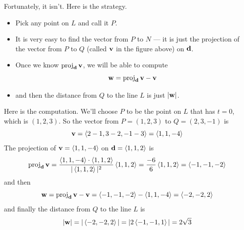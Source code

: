 \begin{eg}
Fortunately, it isn't. Here is the strategy.
\begin{itemize}\itemsep1pt \parskip0pt 
\item 
Pick any point on $L$ and call it $P$.
\item
It is very easy to find the vector from $P$ to $N$ --- it is just the projection of the vector from $P$ to $Q$ (called $\mathbf{v}$ in the figure above)
on $\mathbf{d}$.
\item
Once we know ${\rm proj}_{\mathbf{d}}\,\mathbf{v}$, we will be able to compute
\begin{equation*}
\mathbf{w} = {\rm proj}_{\mathbf{d}}\,\mathbf{v} -\mathbf{v}
\end{equation*}
\item
and then the distance from $Q$ to the line $L$ is just $|\mathbf{w}|$. 
\end{itemize}
Here is the computation. We'll choose $P$ to be the point on $L$ that has 
$t=0$, which is $(1,2,3)$. So the vector from $P=(1,2,3)$ to $Q=(2,3,-1)$ is
\begin{equation*}
\mathbf{v} = \left< 2-1,3-2,-1-3\right>=\left< 1,1,-4\right>
\end{equation*}
The projection of $\mathbf{v}=\left< 1,1,-4\right>$ on $\mathbf{d}=\left< 1,1,2\right>$ is
\begin{equation*}
{\rm proj}_{\mathbf{d}}\,\mathbf{v}
=\frac{\left< 1,1,-4\right>\cdot\left< 1,1,2\right>}{|\left< 1,1,2\right>|^2}\left< 1,1,2\right>
=\frac{-6}{6}\left< 1,1,2\right>
=\left< -1,-1,-2\right>
\end{equation*}
and then
\begin{equation*}
\mathbf{w} = {\rm proj}_{\mathbf{d}}\,\mathbf{v} -\mathbf{v}
    = \left< -1,-1,-2\right> -\left< 1,1,-4\right>
    = \left< -2,-2,2\right>
\end{equation*}
and finally the distance from $Q$ to the  line $L$ is
\begin{equation*}
|\mathbf{w}| = |\left< -2,-2,2\right>|
      =|2\left< -1,-1,1\right>|
      =2\sqrt{3}
\end{equation*}

\end{eg}

